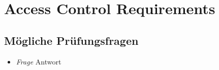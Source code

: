 \section{Access Control Requirements}


\subsection*{Mögliche Prüfungsfragen}
\begin{itemize}
	\item \emph{Frage}
	Antwort
\end{itemize}